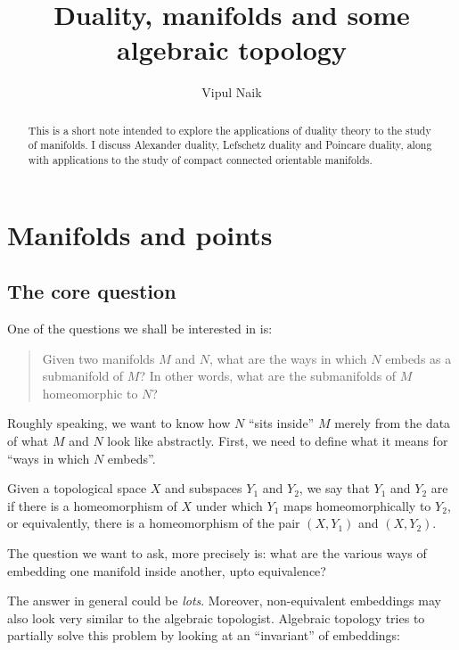 \documentclass[a4paper]{amsart}
\title{Duality, manifolds and some algebraic topology}
\author{Vipul Naik}
\begin{document}
\maketitle

\begin{abstract}
  This is a short note intended to explore the applications of duality
  theory to the study of manifolds. I discuss Alexander duality,
  Lefschetz duality and Poincare duality, along with applications to
  the study of compact connected orientable manifolds.
\end{abstract}

\section{Manifolds and points}

\subsection{The core question}

One of the questions we shall be interested in is:

\begin{quote}
  Given two manifolds $M$ and $N$, what are the ways in which $N$
  embeds as a submanifold of $M$? In other words, what are the
  submanifolds of $M$ homeomorphic to $N$?
\end{quote}

Roughly speaking, we want to know how $N$ ``sits inside'' $M$ merely
from the data of what $M$ and $N$ look like abstractly. First, we need
to define what it means for ``ways in which $N$ embeds''.

\begin{definer}
  Given a topological space $X$ and subspaces $Y_1$ and $Y_2$, we say
  that $Y_1$ and $Y_2$ are  if there is a homeomorphism of $X$ under which $Y_1$ maps
  homeomorphically to $Y_2$, or equivalently, there is a homeomorphism
  of the pair $(X,Y_1)$ and $(X,Y_2)$.
\end{definer}

The question we want to ask, more precisely is: what are the various
ways of embedding one manifold inside another,  upto equivalence?

The answer in general could be {\em lots}. Moreover, non-equivalent
embeddings may also look very similar to the algebraic
topologist. Algebraic topology tries to partially solve this problem
by looking at an ``invariant'' of embeddings:
\end{document}
